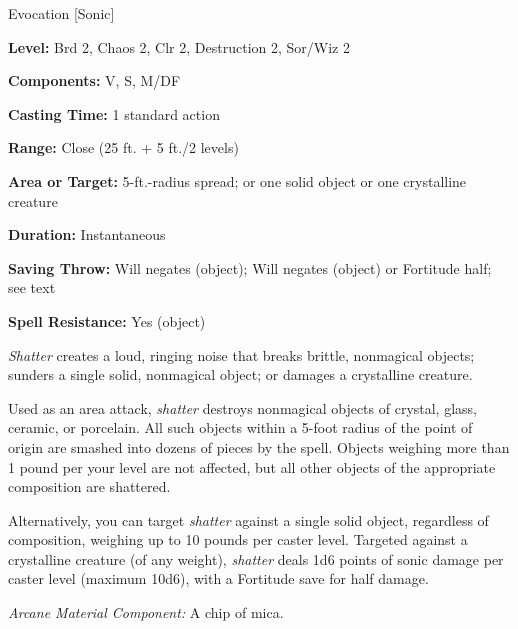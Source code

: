 
Evocation [Sonic]

\textbf{Level:} Brd 2, Chaos 2, Clr 2, Destruction 2, Sor/Wiz 2

\textbf{Components:} V, S, M/DF

\textbf{Casting Time:} 1 standard action

\textbf{Range:} Close (25 ft. + 5 ft./2 levels)

\textbf{Area or Target:} 5-ft.-radius spread; or one solid object or one crystalline 
creature

\textbf{Duration:} Instantaneous

\textbf{Saving Throw:} Will negates (object); Will negates (object) or Fortitude 
half; see text

\textbf{Spell Resistance:} Yes (object)

\textit{Shatter} creates a loud, ringing noise that breaks brittle, nonmagical 
objects; sunders a single solid, nonmagical object; or damages a crystalline creature.

Used as an area attack, \textit{shatter} destroys nonmagical objects of crystal, 
glass, ceramic, or porcelain. All such objects within a 5-foot radius of the point 
of origin are smashed into dozens of pieces by the spell. Objects weighing more 
than 1 pound per your level are not affected, but all other objects of the appropriate 
composition are shattered.

Alternatively, you can target \textit{shatter} against a single solid object, regardless 
of composition, weighing up to 10 pounds per caster level. Targeted against a crystalline 
creature (of any weight), \textit{shatter} deals 1d6 points of sonic damage per 
caster level (maximum 10d6), with a Fortitude save for half damage.

\textit{Arcane Material Component:} A chip of mica.

